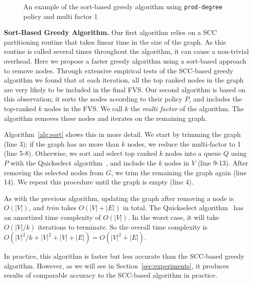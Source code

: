 \begin{figure}[t]
\begin{minipage}[b]{0.19\linewidth}
   		\end{minipage}
  	\vspace{-1em}             
   \caption{An example of the sort-based greedy algorithm using \texttt{prod-degree} policy and multi factor 1}
   \label{fig:simple}               
   \vspace{-1em}    	
\end{figure}

{\bf Sort-Based Greedy Algorithm.} Our first algorithm relies on a SCC partitioning routine that takes linear time in the size of the graph. As this routine is called several times throughout the algorithm, it can cause a non-trivial overhead. Here we propose a faster greedy algorithm using a sort-based approach to remove nodes. Through extensive empirical tests of the SCC-based greedy algorithm we found that at each iteration, all the top ranked nodes in the graph are very likely to be included in the final FVS. Our second algorithm is based on this observation; it sorts the nodes according to their policy $P$, and includes the top-ranked $k$ nodes in the FVS. We call $k$ the \emph{multi factor} of the algorithm. The algorithm removes these nodes and iterates on the remaining graph.

Algorithm~\ref{alg:sort} shows this in more detail. We start by trimming the graph (line 3); if the graph has no more than $k$ nodes, we reduce the multi-factor to 1 (line 5-8). Otherwise, we sort and select top ranked $k$ nodes into a queue $Q$ using $P$ with the Quickselect algorithm~\cite{hoare61cacm}, and include the $k$ nodes in $V$ (line 9-13).
After removing the selected nodes from $G$, we trim the remaining the graph
again (line 14). We repeat this procedure until the graph is empty (line 4). 

As with the previous algorithm, updating the graph after removing a node is $O(|V|)$, and \emph{trim} takes $O(|V|+|E|)$ in total. The
Quickselect algorithm~\cite{hoare61cacm} has an amortized time complexity of
$O(|V|)$. In the worst case, it will take $O(|V|/k)$ iterations to terminate. So
the overall time complexity is $O(|V|^2/k + |V|^2 + |V| + |E|)=O(|V|^2+|E|)$.

In practice, this algorithm is faster but less accurate than the SCC-based greedy algorithm. However, as we will see in Section~\ref{sec:experiments}, it produces results of comparable accuracy to the SCC-based algorithm in practice.

